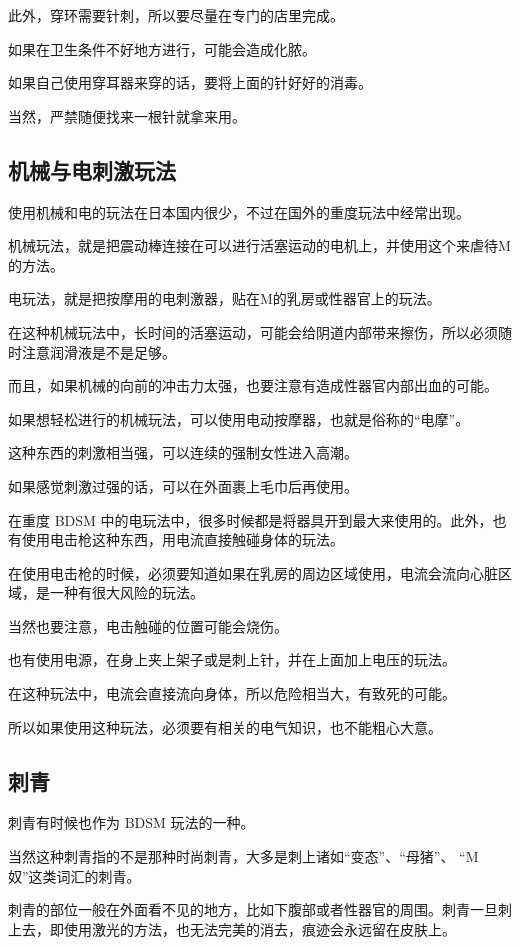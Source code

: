 \documentclass[12pt,UTF8]{ctexbook}
\begin{document}
此外，穿环需要针刺，所以要尽量在专门的店里完成。

如果在卫生条件不好地方进行，可能会造成化脓。

如果自己使用穿耳器来穿的话，要将上面的针好好的消毒。

当然，严禁随便找来一根针就拿来用。

\subsection{机械与电刺激玩法}

使用机械和电的玩法在日本国内很少，不过在国外的重度玩法中经常出现。

机械玩法，就是把震动棒连接在可以进行活塞运动的电机上，并使用这个来虐待M的方法。

电玩法，就是把按摩用的电刺激器，贴在M的乳房或性器官上的玩法。

在这种机械玩法中，长时间的活塞运动，可能会给阴道内部带来擦伤，所以必须随时注意润滑液是不是足够。

而且，如果机械的向前的冲击力太强，也要注意有造成性器官内部出血的可能。

如果想轻松进行的机械玩法，可以使用电动按摩器，也就是俗称的“电摩”。

这种东西的刺激相当强，可以连续的强制女性进入高潮。

如果感觉刺激过强的话，可以在外面裹上毛巾后再使用。

在重度 BDSM 中的电玩法中，很多时候都是将器具开到最大来使用的。此外，也有使用电击枪这种东西，用电流直接触碰身体的玩法。

在使用电击枪的时候，必须要知道如果在乳房的周边区域使用，电流会流向心脏区域，是一种有很大风险的玩法。

当然也要注意，电击触碰的位置可能会烧伤。

也有使用电源，在身上夹上架子或是刺上针，并在上面加上电压的玩法。

在这种玩法中，电流会直接流向身体，所以危险相当大，有致死的可能。

所以如果使用这种玩法，必须要有相关的电气知识，也不能粗心大意。

\subsection{刺青}

刺青有时候也作为 BDSM 玩法的一种。

当然这种刺青指的不是那种时尚刺青，大多是刺上诸如“变态”、“母猪”、 “M奴”这类词汇的刺青。

刺青的部位一般在外面看不见的地方，比如下腹部或者性器官的周围。刺青一旦刺上去，即使用激光的方法，也无法完美的消去，痕迹会永远留在皮肤上。
\end{document}
